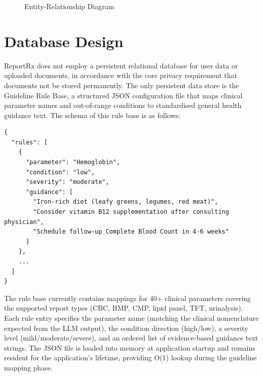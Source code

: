 \begin{figure}[h]
    \centering
    \caption{Entity-Relationship Diagram}
\end{figure}

\section{Database Design}
ReportRx does not employ a persistent relational database for user data or uploaded documents, in accordance with the core privacy requirement that documents not be stored permanently. The only persistent data store is the Guideline Rule Base, a structured JSON configuration file that maps clinical parameter names and out-of-range conditions to standardised general health guidance text. The schema of this rule base is as follows:

\begin{verbatim}
{
  "rules": [
    {
      "parameter": "Hemoglobin",
      "condition": "low",
      "severity": "moderate",
      "guidance": [
        "Iron-rich diet (leafy greens, legumes, red meat)",
        "Consider vitamin B12 supplementation after consulting physician",
        "Schedule follow-up Complete Blood Count in 4-6 weeks"
      ]
    },
    ...
  ]
}
\end{verbatim}

The rule base currently contains mappings for 40+ clinical parameters covering the supported report types (CBC, BMP, CMP, lipid panel, TFT, urinalysis). Each rule entry specifies the parameter name (matching the clinical nomenclature expected from the LLM output), the condition direction (high/low), a severity level (mild/moderate/severe), and an ordered list of evidence-based guidance text strings. The JSON file is loaded into memory at application startup and remains resident for the application's lifetime, providing O(1) lookup during the guideline mapping phase.

